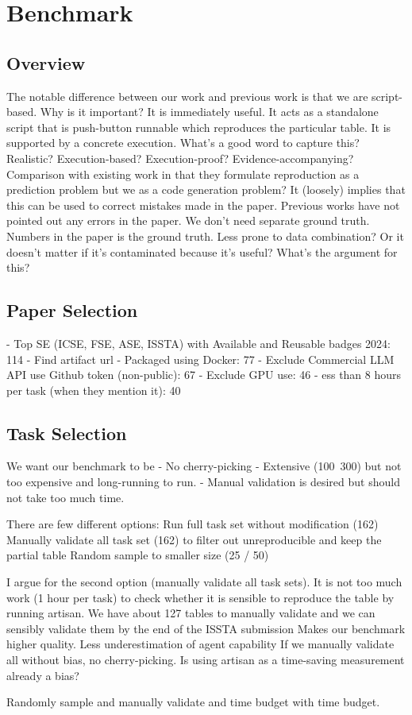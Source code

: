 \section{Benchmark}
\label{s:benchmark}

\subsection{Overview}

The notable difference between our work and previous work is that we are script-based.
Why is it important?
It is immediately useful. It acts as a standalone script that is push-button runnable which reproduces the particular table.
It is supported by a concrete execution.
What’s a good word to capture this? Realistic? Execution-based? Execution-proof? Evidence-accompanying?
Comparison with existing work in that they formulate reproduction as a prediction problem but we as a code generation problem?
It (loosely) implies that this can be used to correct mistakes made in the paper.
Previous works have not pointed out any errors in the paper.
We don’t need separate ground truth. Numbers in the paper is the ground truth.
Less prone to data combination?
Or it doesn’t matter if it’s contaminated because it’s useful?
What’s the argument for this?

\subsection{Paper Selection}
- Top SE (ICSE, FSE, ASE, ISSTA) with Available and Reusable badges 2024: 114
- Find artifact url
- Packaged using Docker: 77
- Exclude Commercial LLM API use Github token (non-public): 67
- Exclude GPU use: 46
- ess than 8 hours per task (when they mention it): 40

\subsection{Task Selection}
We want our benchmark to be
- No cherry-picking
- Extensive (100~300) but not too expensive and long-running to run.
- Manual validation is desired but should not take too much time.

There are few different options:
Run full task set without modification (162)
Manually validate all task set (162) to filter out unreproducible and keep the partial table
Random sample to smaller size (25 / 50)

I argue for the second option (manually validate all task sets).
It is not too much work (1 hour per task) to check whether it is sensible to reproduce the table by running artisan.
We have about 127 tables to manually validate and we can sensibly validate them by the end of the ISSTA submission
Makes our benchmark higher quality. Less underestimation of agent capability
If we manually validate all without bias, no cherry-picking.
Is using artisan as a time-saving measurement already a bias?

Randomly sample and manually validate and time budget with time budget.

